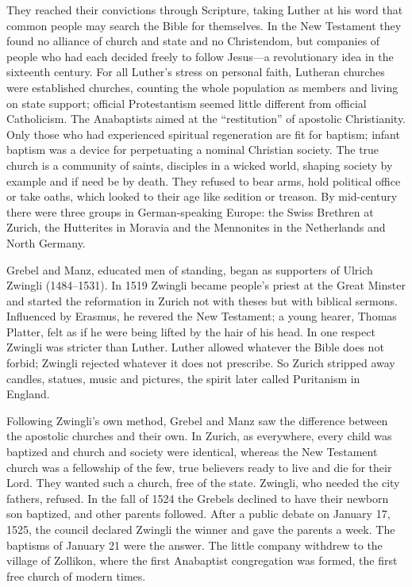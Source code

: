 They reached their convictions through Scripture, taking Luther at his word that common people may
search the Bible for themselves. In the New Testament they found no alliance of church and state and
no Christendom, but companies of people who had each decided freely to follow Jesus---a
revolutionary idea in the sixteenth century. For all Luther's stress on personal faith, Lutheran
churches were established churches, counting the whole population as members and living on state
support; official Protestantism seemed little different from official Catholicism. The Anabaptists
aimed at the ``restitution'' of apostolic Christianity. Only those who had experienced spiritual
regeneration are fit for baptism; infant baptism was a device for perpetuating a nominal Christian
society. The true church is a community of saints, disciples in a wicked world, shaping society by
example and if need be by death. They refused to bear arms, hold political office or take oaths,
which looked to their age like sedition or treason. By mid-century there were three groups in
German-speaking Europe: the Swiss Brethren at Zurich, the Hutterites in Moravia and the Mennonites in
the Netherlands and North Germany.

Grebel and Manz, educated men of standing, began as supporters of Ulrich Zwingli (1484--1531). In
1519 Zwingli became people's priest at the Great Minster and started the reformation in Zurich not
with theses but with biblical sermons. Influenced by Erasmus, he revered the New Testament; a young
hearer, Thomas Platter, felt as if he were being lifted by the hair of his head. In one respect
Zwingli was stricter than Luther. Luther allowed whatever the Bible does not forbid; Zwingli rejected
whatever it does not prescribe. So Zurich stripped away candles, statues, music and pictures, the
spirit later called Puritanism in England.

Following Zwingli's own method, Grebel and Manz saw the difference between the apostolic churches and
their own. In Zurich, as everywhere, every child was baptized and church and society were identical,
whereas the New Testament church was a fellowship of the few, true believers ready to live and die for
their Lord. They wanted such a church, free of the state. Zwingli, who needed the city fathers,
refused. In the fall of 1524 the Grebels declined to have their newborn son baptized, and other
parents followed. After a public debate on January 17, 1525, the council declared Zwingli the winner
and gave the parents a week. The baptisms of January 21 were the answer. The little company withdrew
to the village of Zollikon, where the first Anabaptist congregation was formed, the first free church
of modern times.

